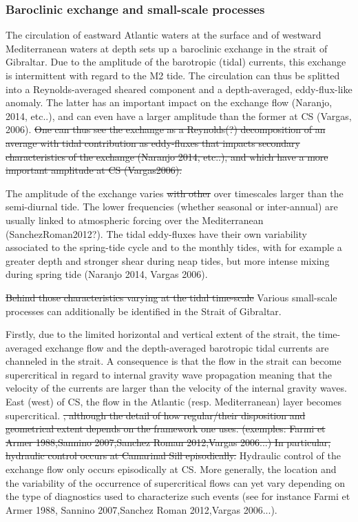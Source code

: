 \subsubsection{Baroclinic exchange and small-scale processes}


The circulation of eastward Atlantic waters at the surface and of westward Mediterranean waters at depth sets up a baroclinic exchange in the strait of Gibraltar. Due to the amplitude of the barotropic \color{blue}(tidal) currents, this exchange is \color{black} intermittent with regard to the M2 tide. \color{blue}The circulation can thus be splitted into a Reynolds-averaged sheared component and a depth-averaged, eddy-flux-like anomaly. The latter has an important impact on the exchange flow (Naranjo, 2014, etc..), and can even have a larger amplitude than the former at CS (Vargas, 2006). \color{black}
\sout{One can thus see the exchange as a Reynolds(?) decomposition of an average with tidal contribution as eddy-fluxes that impacts secondary characteristics of the exchange (Naranjo 2014, etc..), and which have a more important amplitude at CS (Vargas2006).}  

\color{blue}The amplitude of the exchange varies \sout{with other} over timescales larger than the semi-diurnal tide. The lower frequencies (whether seasonal or inter-annual) are usually linked to atmospheric forcing over the Mediterranean (SanchezRoman2012?). \color{black} The tidal eddy-fluxes have their own variability associated to the spring-tide cycle and to the monthly tides, with for example a greater depth and stronger shear during neap tides, but more intense mixing during spring tide (Naranjo 2014, Vargas 2006).

\sout{Behind those characteristics varying at the tidal time-scale} \color{blue}Various small-scale processes can additionally be identified in the Strait of Gibraltar. \color{black}

Firstly, due to the limited horizontal and vertical extent of the strait, \color{blue} the time-averaged exchange flow and the depth-averaged barotropic tidal currents are channeled in the strait. \color{black} A consequence is that the flow in the strait can become supercritical in regard to internal gravity wave propagation \color{blue} meaning that the velocity of the currents are larger than the velocity of the internal gravity waves. \color{black} East (west) of CS, the flow in the Atlantic (resp. Mediterranean) layer becomes supercritical.
\sout{, although the detail of how regular/their disposition and geometrical extent depends on the framework one uses. (exemples: Farmi et Armer 1988,Sannino 2007,Sanchez Roman 2012,Vargas 2006...) In particular, hydraulic control occurs at Camarinal Sill episodically.}
\color{blue} Hydraulic control of the exchange flow only occurs episodically at CS. More generally, the location and the variability of the occurrence of supercritical flows can yet vary depending on the type of diagnostics used to characterize such events (see for instance Farmi et Armer 1988, Sannino 2007,Sanchez Roman 2012,Vargas 2006...). \color{black}

